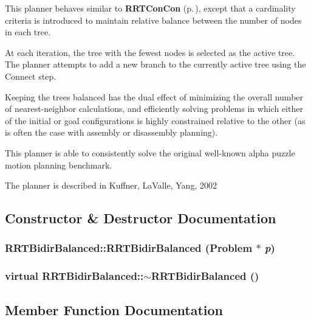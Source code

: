 This planner behaves similar to {\bf RRTCon\-Con} {\rm (p.\,\pageref{classRRTConCon})}, except that a cardinality criteria is introduced to maintain relative balance between the number of nodes in each tree.

At each iteration, the tree with the fewest nodes is selected as the active tree. The planner attempts to add a new branch to the currently active tree using the Connect step.

Keeping the trees balanced has the dual effect of minimizing the overall number of nearest-neighbor calculations, and efficiently solving problems in which either of the initial or goal configurations is highly constrained relative to the other (as is often the case with assembly or disassembly planning).

This planner is able to consistently solve the original well-known alpha puzzle motion planning benchmark.

The planner is described in Kuffner, La\-Valle, Yang, 2002 



\subsection{Constructor \& Destructor Documentation}
\subsubsection{\setlength{\rightskip}{0pt plus 5cm}RRTBidir\-Balanced::RRTBidir\-Balanced ({\bf Problem} $\ast$ {\em p})}\label{classRRTBidirBalanced_a0}


\subsubsection{\setlength{\rightskip}{0pt plus 5cm}virtual RRTBidir\-Balanced::$\sim$RRTBidir\-Balanced ()\hspace{0.3cm}{\tt  [inline, virtual]}}\label{classRRTBidirBalanced_a1}




\subsection{Member Function Documentation}
